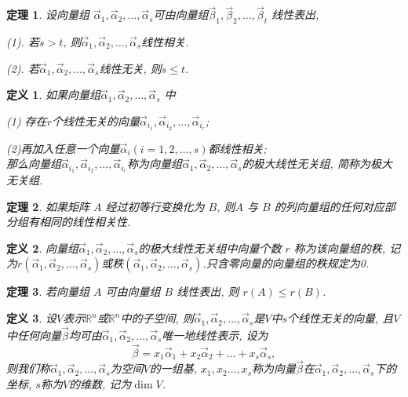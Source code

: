 \documentclass[a4paper]{book}
\newtheorem{Def}{定义}[chapter]
\newtheorem{thm}{定理}[chapter]
\begin{document}
\begin{thm}
设向量组 $\vec{\alpha}_1,\vec{\alpha}_2,\dots, \vec{\alpha}_s$可由向量组$\vec{\beta}_1,\vec{\beta}_2,\dots,\vec{\beta}_t$ 线性表出,

(1). 若$s>t$, 则$\vec{\alpha}_1,\vec{\alpha}_2,\dots, \vec{\alpha}_s$线性相关.

(2). 若$\vec{\alpha}_1,\vec{\alpha}_2,\dots, \vec{\alpha}_s$线性无关, 则$s\leq t$.
\end{thm}

\begin{Def}
如果向量组$\vec{\alpha}_1,\vec{\alpha}_2,\dots, \vec{\alpha}_s$ 中

(1) 存在$r$个线性无关的向量$\vec{\alpha}_{i_1},\vec{\alpha}_{i_2},\dots, \vec{\alpha}_{i_r}$;

(2)再加入任意一个向量$\vec{\alpha}_i(i=1,2,\dots,s)$都线性相关;\\
那么向量组$\vec{\alpha}_{i_1},\vec{\alpha}_{i_2},\dots, \vec{\alpha}_{i_r}$称为向量组$\vec{\alpha}_1,\vec{\alpha}_2,\dots, \vec{\alpha}_s$的极大线性无关组, 简称为极大无关组.


\end{Def}

\begin{thm}
如果矩阵 $A$ 经过初等行变换化为 $B$, 则$ A$ 与 $B$ 的列向量组的任何对应部分组有相同的线性相关性.

\end{thm}

\begin{Def}
向量组$\vec{\alpha}_1,\vec{\alpha}_2,\dots, \vec{\alpha}_s$的极大线性无关组中向量个数 $r$ 称为该向量组的秩, 记为$r(\vec{\alpha}_1,\vec{\alpha}_2,\dots, \vec{\alpha}_s)$或秩$(\vec{\alpha}_1,\vec{\alpha}_2,\dots, \vec{\alpha}_s)$.只含零向量的向量组的秩规定为0.
\end{Def}

\begin{thm}
若向量组 $A$ 可由向量组 $B$ 线性表出,  则 $r(A)\leq
r(B)$.
\end{thm}

\begin{Def}
设$V$表示$\mathbb{R}^n$或$\mathbb{R}^n$中的子空间, 则$\vec{\alpha}_1,\vec{\alpha}_2,\dots, \vec{\alpha}_s$是$V$中$s$个线性无关的向量, 且$V$中任何向量$\vec{\beta}$均可由$\vec{\alpha}_1,\vec{\alpha}_2,\dots, \vec{\alpha}_s$唯一地线性表示, 设为
$$\vec{\beta}=x_1\vec{\alpha}_1+x_2\vec{\alpha}_2+\dots+x_s \vec{\alpha}_s,$$
则我们称$\vec{\alpha}_1,\vec{\alpha}_2,\dots, \vec{\alpha}_s$为空间$V$的一组基, $x_1,x_2\dots,x_s$称为向量$\vec{\beta}$在$\vec{\alpha}_1,\vec{\alpha}_2,\dots, \vec{\alpha}_s$下的坐标, $s$称为$V$的维数, 记为$\dim V$.

\end{Def}
\end{document}
